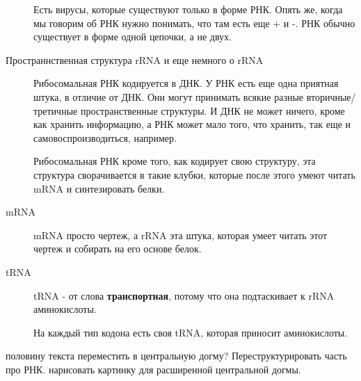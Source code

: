\begin{description}
Есть вирусы, которые существуют только в форме РНК. Опять же,
когда мы говорим об РНК нужно понимать, что там есть еще + и -. РНК
обычно существует в форме одной цепочки, а не двух.

\item[Пространнственная структура rRNA и еще немного о rRNA]
Рибосомальная РНК кодируется в ДНК. У РНК есть
еще одна приятная штука, в отличие от ДНК. Они могут
принимать всякие разные вторичные/третичные пространственные структуры.
И ДНК не может ничего, кроме как хранить информацию, а РНК может
мало того, что хранить, так еще и самовоспроизводиться, например.

Рибосомальная РНК кроме того, как кодирует свою структуру, эта структура 
сворачивается в такие клубки, которые после этого умеют 
читать mRNA и синтезировать белки.

\item[mRNA]
mRNA просто чертеж, а rRNA эта штука, которая умеет читать этот чертеж и собирать
на его основе белок.

\item[tRNA]
tRNA - от слова \textbf{транспортная}, потому что она подтаскивает к rRNA аминокислоты.

На каждый тип кодона есть своя tRNA, которая приносит аминокислоты.
\end{description}

\TODO половину текста переместить в центральную догму? Переструктурировать часть про РНК.
\TODO нарисовать картинку для расширенной центральной догмы. 

